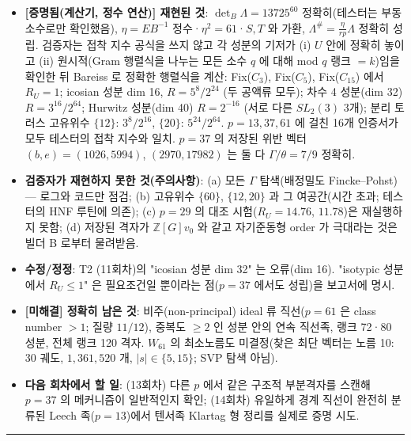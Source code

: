 \begin{itemize}
\tightlist
\item
  \textbf{{[}증명됨(계산기, 정수 연산){]} 재현된 것}: \(\det_B\Lambda=13725^{60}\) 정확히(테스터는 부동소수로만 확인했음), \(\eta=EB^{-1}\) 정수·\(\eta^2=61\)·\(S,T\) 와 가환, \(\Lambda^\#=\frac{\eta}{rp}\Lambda\) 정확히 성립. 검증자는 접착 지수 공식을 쓰지 않고 각 성분의 기저가 (i) \(U\) 안에 정확히 놓이고 (ii) 원시적(Gram 행렬식을 나누는 모든 소수 \(q\) 에 대해 mod \(q\) 랭크 \(=k\))임을 확인한 뒤 Bareiss 로 정확한 행렬식을 계산: Fix(\(C_3\)), Fix(\(C_5\)), Fix(\(C_{15}\)) 에서 \(R_U=1\); icosian 성분 dim 16, \(R=5^8/2^{24}\) (두 공액류 모두); 차수 4 성분(dim 32) \(R=3^{16}/2^{64}\); Hurwitz 성분(dim 40) \(R=2^{-16}\) (서로 다른 \(SL_2(3)\) 3개); 분리 토러스 고유위수 \(\{12\}\): \(3^8/2^{16}\), \(\{20\}\): \(5^{24}/2^{64}\). \(p=13,37,61\) 에 걸친 16개 인증서가 모두 테스터의 접착 지수와 일치. \(p=37\) 의 저장된 위반 벡터 \((b,e)=(1026,5994)\), \((2970,17982)\) 는 둘 다 \(\Gamma/\theta=7/9\) 정확히.
\item
  \textbf{검증자가 재현하지 못한 것(주의사항)}: (a) 모든 \(\Gamma\) 탐색(배정밀도 Fincke--Pohst) --- 로그와 코드만 점검; (b) 고유위수 \(\{60\}\), \(\{12,20\}\) 과 그 여공간(시간 초과; 테스터의 HNF 루틴에 의존); (c) \(p=29\) 의 대조 시험(\(R_U=14.76\), \(11.78\))은 재실행하지 못함; (d) 저장된 격자가 \(\mathbb Z[G]v_0\) 와 같고 자기준동형 order 가 극대라는 것은 빌더 B 로부터 물려받음.
\item
  \textbf{수정/정정}: T2 (11회차)의 "icosian 성분 dim 32" 는 오류(dim 16). "isotypic 성분에서 \(R_U\le1\)" 은 필요조건일 뿐이라는 점(\(p=37\) 에서도 성립)을 보고서에 명시.
\item
  \textbf{{[}미해결{]} 정확히 남은 것}: 비주(non-principal) ideal 류 직선(\(p=61\) 은 class number \(>1\); 질량 \(11/12\)), 중복도 \(\ge2\) 인 성분 안의 연속 직선족, 랭크 72·80 성분, 전체 랭크 120 격자. \(W_{61}\) 의 최소노름도 미결정(찾은 최단 벡터는 노름 10: 30 궤도, \(1{,}361{,}520\) 개, \(|s|\in\{5,15\}\); SVP 탐색 아님).
\item
  \textbf{다음 회차에서 할 일}: (13회차) 다른 \(p\) 에서 같은 구조적 부분격자를 스캔해 \(p=37\) 의 메커니즘이 일반적인지 확인; (14회차) 유일하게 경계 직선이 완전히 분류된 Leech 족(\(p=13\))에서 텐서족 Klartag 형 정리를 실제로 증명 시도.
\end{itemize}

\begin{center}\rule{0.5\linewidth}{0.5pt}\end{center}

